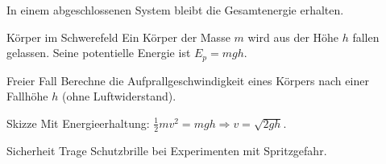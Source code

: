 \documentclass[11pt,a4paper,oneside]{article}
\begin{document}
	
	\newpage
	
	
	
	
	
	
	\newpage
	
	
	
	
	
	
	
	\begin{theo}
		In einem abgeschlossenen System bleibt die Gesamtenergie erhalten.
	\end{theo}
	
	\begin{exem}{Körper im Schwerefeld}
		Ein Körper der Masse $m$ wird aus der Höhe $h$ fallen gelassen. Seine potentielle Energie ist $E_p = mgh$.
	\end{exem}
	
	\begin{aufgabe}{Freier Fall}
		Berechne die Aufprallgeschwindigkeit eines Körpers nach einer Fallhöhe $h$ (ohne Luftwiderstand).
	\end{aufgabe}
	
	\begin{loesung}{Skizze}
		Mit Energieerhaltung: $\frac12 mv^2 = mgh \Rightarrow v=\sqrt{2gh}$.
	\end{loesung}
	
	\begin{infobox}{Sicherheit}
		Trage Schutzbrille bei Experimenten mit Spritzgefahr.
	\end{infobox}
	
\end{document}
